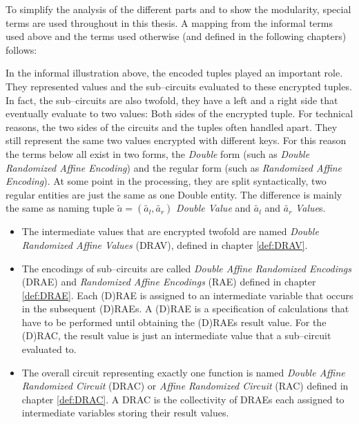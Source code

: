 To simplify the analysis of the different parts and to show the
modularity, special terms are used throughout in this thesis. A mapping from the
informal terms used above and the terms used otherwise (and defined in the
following chapters) follows:

In the informal illustration above, the encoded tuples played an important role.
They represented values and the sub--circuits evaluated to these encrypted
tuples. In fact, the sub--circuits are also twofold, they have a left and a
right side that eventually evaluate to two values: Both sides of the encrypted
tuple. For technical reasons, the two sides of the circuits and the tuples often
handled apart. They still represent the same two values encrypted with different
keys. For this reason the terms below all exist in two forms, the \emph{Double}
form (such as \emph{Double Randomized Affine Encoding}) and the regular form
(such as \emph{Randomized Affine Encoding}). At some point in the processing,
they are split syntactically, two regular entities are just the same as one
Double entity. The difference is mainly the same as naming tuple $\widetilde{a}
= (\widetilde{a_l}, \widetilde{a_r})$ \emph{Double Value} and $\widetilde{a_l}$
and $\widetilde{a_r}$ \emph{Value}s.

\begin{itemize}

  \item The intermediate values that are encrypted twofold are named
    \emph{Double Randomized Affine Values} (DRAV), defined in chapter
    \ref{def:DRAV}.

  \item The encodings of sub--circuits are called \emph{Double Affine Randomized
    Encodings} (DRAE) and \emph{Randomized Affine Encodings} (RAE) defined in
    chapter \ref{def:DRAE}. Each (D)RAE is assigned to an intermediate variable
    that occurs in the subsequent (D)RAEs. A (D)RAE is a specification of
    calculations that have to be performed until obtaining the (D)RAEs result
    value. For the (D)RAC, the result value is just an intermediate
    value that a sub--circuit evaluated to.

  \item The overall circuit representing exactly one function is named
    \emph{Double Affine Randomized Circuit} (DRAC) or \emph{Affine Randomized
    Circuit} (RAC) defined in chapter \ref{def:DRAC}. A DRAC is the collectivity
    of DRAEs each assigned to intermediate variables storing their result
    values.

\end{itemize}


